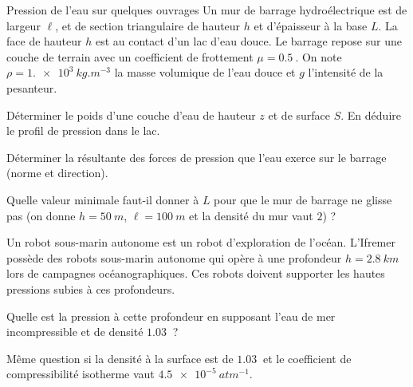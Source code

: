 \begin{exo}[MPSI]{Pression de l'eau sur quelques ouvrages}
Un mur de barrage hydroélectrique est de largeur $\ell$, et de section triangulaire de hauteur $h$ et d'épaisseur à la base $L$. La face de hauteur $h$ est au contact d'un lac d'eau douce. Le barrage repose sur une couche de terrain avec un coefficient de frottement $\mu=\SI{0.5}{}$. On note $\rho=\SI{1.e3}{kg.m^{-3}}$ la masse volumique de l'eau douce et $g$ l'intensité de la pesanteur.
\begin{quest}
\item Déterminer le poids d'une couche d'eau de hauteur $z$ et de surface $S$. En déduire le profil de pression dans le lac.
\item Déterminer la résultante des forces de pression que l'eau exerce sur le barrage (norme et direction).

\item Quelle valeur minimale faut-il donner à $L$ pour que le mur de barrage ne glisse pas (on donne $h=\SI{50}{m}$, $\ell=\SI{100}{m}$ et la densité du mur vaut $2$) ?
\end{quest}

Un robot sous-marin autonome est un robot d'exploration de l'océan. L'Ifremer possède des robots sous-marin autonome qui opère à une profondeur $h=\SI{2.8}{km}$ lors de campagnes océanographiques. Ces robots doivent supporter les hautes pressions subies à ces profondeurs.

\begin{quest}
\item Quelle est la pression à cette profondeur en supposant l'eau de mer incompressible et de densité $\SI{1.03}{}$ ?
\item Même question si la densité à la surface est de $\SI{1.03}{}$ et le coefficient de compressibilité isotherme vaut $\SI{4.5e-5}{atm^{-1}}$.
\end{quest}


\end{exo}

